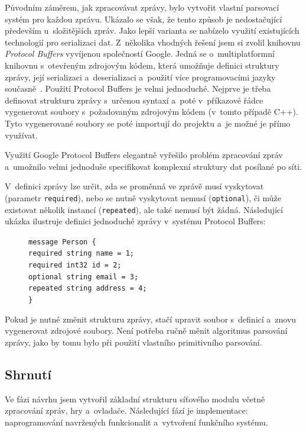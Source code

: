\documentclass[thesis=B,czech,hidelinks]{FITthesis}[2012/06/26] %
\newcommand{\code}[1]{\texttt{#1}}
\newcommand\tab[1][1cm]{\hspace*{#1}}
\begin{document}
Původním záměrem, jak zpracovávat zprávy, bylo vytvořit vlastní parsovací systém pro každou zprávu. Ukázalo se však, že tento způsob je nedostačující především u~složitějších zpráv. Jako lepší varianta se nabízelo využití existujících technologií pro serializaci dat. Z~několika vhodných řešení jsem si zvolil knihovnu \textit{Protocol Buffers} vyvíjenou společností Google. Jedná se o~multiplatformní knihovnu s~otevřeným zdrojovým kódem, která umožňuje definici struktury zprávy, její serializaci a~deserializaci a~použití více programovacími jazyky současně~\cite{protobuf}. Použití Protocol Buffers je velmi jednoduché. Nejprve je třeba definovat strukturu zprávy s~určenou syntaxí a~poté v~příkazové řádce vygenerovat soubory s~požadovaným zdrojovým kódem (v~tomto případě C++). Tyto vygenerované soubory se poté importují do projektu a~je možné je přímo využívat.

Využití Google Protocol Buffers elegantně vyřešilo problém zpracování zpráv a~umožnilo velmi jednoduše specifikovat komplexní struktury dat posílané po síti.

V~definici zprávy lze určit, zda se proměnná ve zprávě musí vyskytovat (parametr \code{required}), nebo se nutně vyskytovat nemusí (\code{optional}), či může existovat několik instancí (\code{repeated}), ale také nemusí být žádná. Následující ukázka ilustruje definici jednoduché zprávy v~systému Protocol Buffers:

\begin{figure}[h]
\code{message Person \{ \\
\tab required string name = 1; \\
\tab required int32 id = 2; \\
\tab optional string email = 3; \\
\tab repeated string address = 4; \\
\}}
\end{figure}

Pokud je nutné změnit strukturu zprávy, stačí upravit soubor s~definicí a~znovu vygenerovat zdrojové soubory. Není potřeba ručně měnit algoritmus parsování zprávy, jako by tomu bylo při použití vlastního primitivního parsování.

\subsection{Shrnutí}

Ve fázi návrhu jsem vytvořil základní strukturu síťového modulu včetně zpracování zpráv, hry a~ovladače. Následující fází je implementace: naprogramování navržených funkcionalit a~vytvoření funkčního systému.
\end{document}
